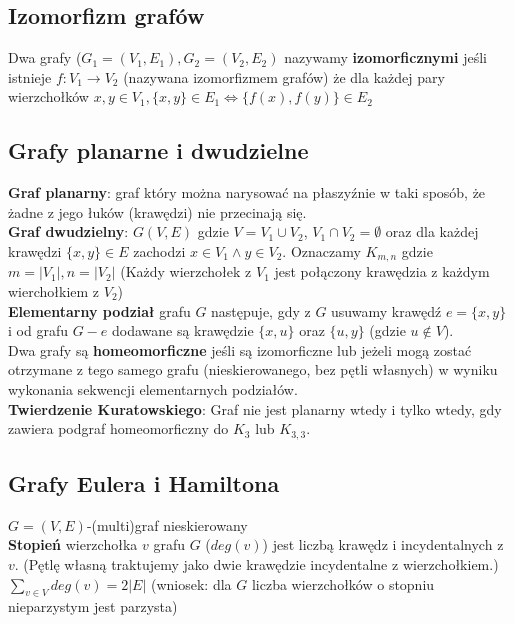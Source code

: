 \documentclass[a4paper,12pt]{article}
\begin{document}
\subsection{Izomorfizm grafów}
Dwa grafy ($G_1=(V_1,E_1),G_2=(V_2,E_2)$ nazywamy \textbf{izomorficznymi} jeśli istnieje  $f: V_1 \rightarrow V_2$ (nazywana izomorfizmem grafów) że dla każdej pary wierzchołków $x,y \in V_1, \{x,y\}\in E_1 \Leftrightarrow \{f(x),f(y)\} \in E_2$

\subsection{Grafy planarne i dwudzielne}
\textbf{Graf planarny}: graf który można narysować na płaszyźnie w taki sposób, że żadne z jego łuków (krawędzi) nie przecinają się.\\
\textbf{Graf dwudzielny}: $G(V,E)$ gdzie $V=V_1\cup V_2$, $V_1\cap V_2=\emptyset$ oraz dla każdej krawędzi $\{x,y\}\in E$ zachodzi $x\in V_1 \wedge y\in V_2$. Oznaczamy $K_{m,n}$ gdzie $m=|V_1|, n=|V_2|$ (Każdy wierzchołek z $V_1$ jest połączony krawędzia z każdym wierchołkiem z $V_2$)\\
\textbf{Elementarny podział} grafu $G$ następuje, gdy z $G$ usuwamy krawędź $e=\{x,y\}$ i od grafu $G-e$ dodawane są krawędzie $\{x,u\}$ oraz $\{u,y\}$ (gdzie $u \notin V$).\\
Dwa grafy są \textbf{homeomorficzne} jeśli są izomorficzne lub jeżeli mogą zostać otrzymane z tego samego grafu (nieskierowanego, bez pętli własnych) w wyniku wykonania sekwencji elementarnych podziałów.\\
\textbf{Twierdzenie Kuratowskiego}: Graf nie jest planarny wtedy i tylko wtedy, gdy zawiera podgraf homeomorficzny do $K_3$ lub $K_{3,3}$.
\subsection{Grafy Eulera i Hamiltona}
$G=(V,E)$-(multi)graf nieskierowany\\
\textbf{Stopień} wierzchołka $v$ grafu $G$ ($deg(v)$) jest liczbą krawędz
i incydentalnych z $v$. (Pętlę własną traktujemy jako dwie krawędzie incydentalne z wierzchołkiem.)\\
$\sum_{v\in V} deg(v)=2|E|$ (wniosek: dla $G$ liczba wierzchołków o stopniu nieparzystym jest parzysta)\\
\end{document}

